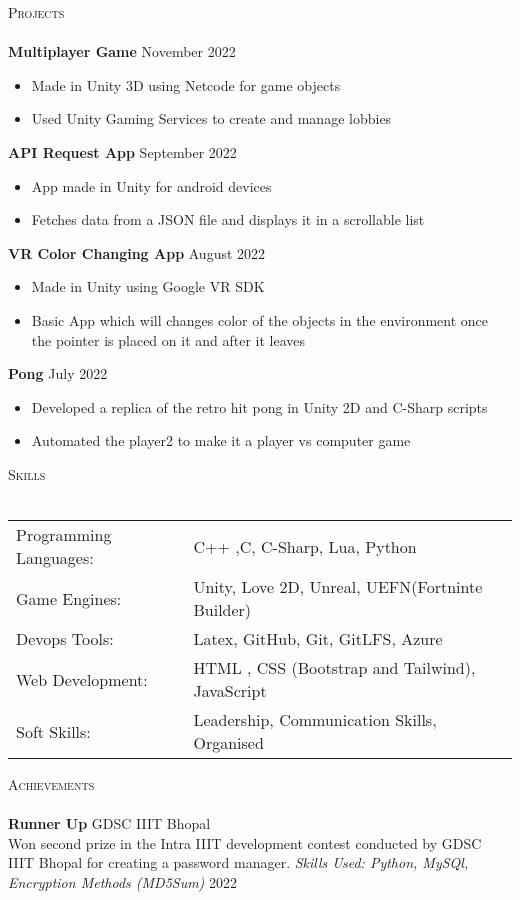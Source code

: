 \documentclass[a4paper]{article}
\newcommand{\lineunder} {
    \vspace*{-8pt} \\
    \hspace*{-18pt} \hrulefill \\
}
\newcommand{\header} [1] {
    {\hspace*{-18pt}\vspace*{6pt} \textsc{#1}}
    \vspace*{-6pt} \lineunder
}
\begin{document}
\vspace{1mm}

\header{Projects}
{\textbf{Multiplayer Game}} \hfill November 2022
\vspace{-2.5mm}
\begin{itemize} 
	\item Made in Unity 3D using Netcode for game objects
  \vspace{-2.5mm}
        \item Used Unity Gaming Services to create and manage lobbies 
\end{itemize}
{\textbf{API Request App}} \hfill September 2022
\vspace{-2.5mm}
\begin{itemize} 
	\item App made in Unity for android devices
  \vspace{-2.5mm}
        \item Fetches data from a JSON file and displays it in a scrollable list
\end{itemize}
{\textbf{VR Color Changing App}} \hfill August 2022
\vspace{-2.5mm}
\begin{itemize} 
	\item Made in Unity using Google VR SDK
  \vspace{-2.5mm}
        \item Basic App which will changes color of the objects in the environment once the pointer is placed on it and after it leaves
\end{itemize}
{\textbf{Pong}} \hfill July 2022
\vspace{-2.5mm}
\begin{itemize} 
	\item Developed a replica of the retro hit pong in Unity 2D and C-Sharp scripts
  \vspace{-2.5mm}
        \item Automated the player2 to make it a player vs computer game 
\end{itemize}
\header{Skills}
\vspace{2mm}
\begin{tabular}{ l l }
	Programming Languages: & C++ ,C, C-Sharp, Lua, Python \\
	Game Engines:& Unity, Love 2D, Unreal, UEFN(Fortninte Builder)  \\
        Devops Tools:        & Latex, GitHub, Git, GitLFS, Azure \\  
	Web Development:       & HTML , CSS (Bootstrap and Tailwind), JavaScript   \\
	Soft Skills:           &  Leadership, Communication Skills, Organised  \\
\end{tabular}

\vspace{2mm}
\header{Achievements}
\textbf{Runner Up} \hfill GDSC IIIT Bhopal\\
Won second prize in the Intra IIIT development contest conducted by GDSC IIIT Bhopal for creating a password manager.  
{\textit {Skills Used: Python, MySQl, Encryption Methods (MD5Sum)}}  \hfill 2022\\
\end{document}
